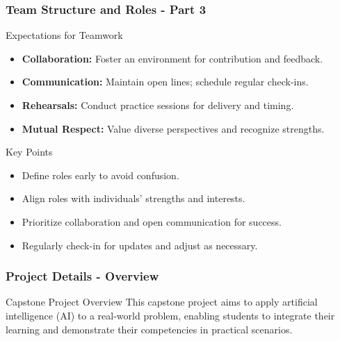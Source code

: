 \documentclass[aspectratio=169]{beamer}
\begin{document}
\begin{frame}[fragile]
    \frametitle{Team Structure and Roles - Part 3}
    \begin{block}{Expectations for Teamwork}
        \begin{itemize}
            \item \textbf{Collaboration:} Foster an environment for contribution and feedback.
            \item \textbf{Communication:} Maintain open lines; schedule regular check-ins.
            \item \textbf{Rehearsals:} Conduct practice sessions for delivery and timing.
            \item \textbf{Mutual Respect:} Value diverse perspectives and recognize strengths.
        \end{itemize}
    \end{block}
    
    \begin{block}{Key Points}
        \begin{itemize}
            \item Define roles early to avoid confusion.
            \item Align roles with individuals' strengths and interests.
            \item Prioritize collaboration and open communication for success.
            \item Regularly check-in for updates and adjust as necessary.
        \end{itemize}
    \end{block}
\end{frame}

\begin{frame}[fragile]
    \frametitle{Project Details - Overview}
    \begin{block}{Capstone Project Overview}
        This capstone project aims to apply artificial intelligence (AI) to a real-world problem, enabling students to integrate their learning and demonstrate their competencies in practical scenarios.
    \end{block}
\end{frame}
\end{document}
